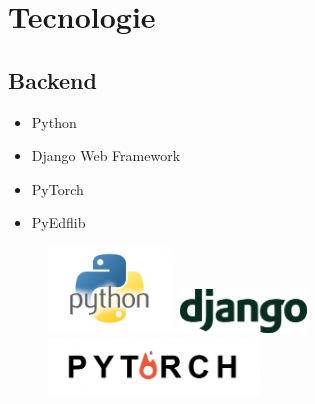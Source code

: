 \documentclass[xcolor=x11names,compress, 
]{beamer}
\theoremstyle{definition} \newtheorem{esempio}{Esempio}
\theoremstyle{definition}
\begin{document}
\section{Tecnologie}
	\subsection{Backend}
		\begin{frame}{\subsecname}
			\begin{itemize}
				\item Python
				\item Django Web Framework 
				\item PyTorch 
				\item PyEdflib
			\end{itemize}
			\begin{figure}
				\includegraphics[width=0.3\textwidth]{immagini/python}
				\includegraphics[width=0.3\textwidth]{immagini/django}
				\includegraphics[width=0.5\textwidth]{immagini/pytorch}
			\end{figure}
		\end{frame}
	
\end{document}
